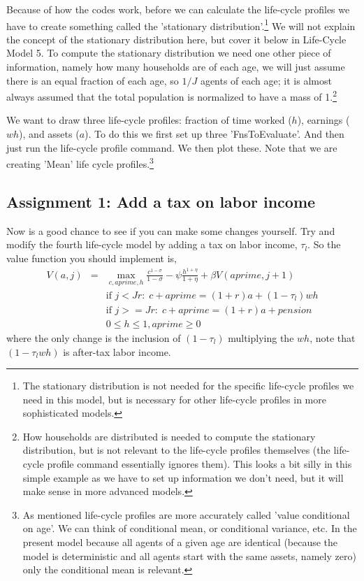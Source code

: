 Because of how the codes work, before we can calculate the life-cycle profiles we have to create something called the 'stationary distribution'.\footnote{The stationary distribution is not needed for the specific life-cycle profiles we need in this model, but is necessary for other life-cycle profiles in more sophisticated models.} We will not explain the concept of the stationary distribution here, but cover it below in Life-Cycle Model 5. To compute the stationary distribution we need one other piece of information, namely how many households are of each age, we will just assume there is an equal fraction of each age, so $1/J$ agents of each age; it is almost always assumed that the total population is normalized to have a mass of 1.\footnote{How households are distributed is needed to compute the stationary distribution, but is not relevant to the life-cycle profiles themselves (the life-cycle profile command essentially ignores them). This looks a bit silly in this simple example as we have to set up information we don't need, but it will make sense in more advanced models.}

We want to draw three life-cycle profiles: fraction of time worked ($h$), earnings ($wh$), and assets ($a$). To do this we first set up three 'FnsToEvaluate'. And then just run the life-cycle profile command. We then plot these. Note that we are creating 'Mean' life cycle profiles.\footnote{As mentioned life-cycle profiles are more accurately called 'value conditional on age'. We can think of conditional mean, or conditional variance, etc. In the present model because all agents of a given age are identical (because the model is deterministic and all agents start with the same assets, namely zero) only the conditional mean is relevant.}


\subsection{Assignment 1: Add a tax on labor income}
Now is a good chance to see if you can make some changes yourself. Try and modify the fourth life-cycle model by adding a tax on labor income, $\tau_l$. So the value function you should implement is,
\begin{eqnarray*}
 V(a,j)&=& \max_{c,aprime,h} \frac{c^{1-\sigma}}{1-\sigma} - \psi \frac{h^{1+\eta}}{1+\eta}  + \beta V(aprime,j+1) \\
&& \text{if }j<Jr: \; c+aprime=(1+r)a+(1-\tau_l) w h \\
&& \text{if }j>=Jr: \; c+aprime=(1+r)a +pension\\
&& 0\leq h \leq 1, aprime\geq 0
\end{eqnarray*}
where the only change is the inclusion of $(1-\tau_l)$ multiplying the $wh$, note that $(1-\tau_l wh)$ is after-tax labor income.

